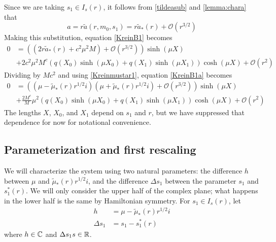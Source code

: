 \documentclass[thesis.tex]{subfiles}
\begin{document}
Since we are taking $s_1 \in I_s(r)$, it follows from \cref{tildeasub} and \cref{lemma:chara} that
\[
a = r \tilde{a}(r, m_0, s_1) = r\tilde{a}_*(r) + \mathcal{O}\left( r^{3/2} \right)
\]
Making this substitution, equation \cref{KreinB1} becomes
\begin{equation}\label{KreinB1a}
\begin{aligned}
0 &= \left( (2r\tilde{a}_*(r) + c^2 \mu^2 M) + \mathcal{O}( r^{3/2} )\right) \sinh(\mu X) \\
&+ 2 c^2 \mu^2 M^c ( q(X_0) \sinh(\mu X_0) + q(X_1) \sinh(\mu X_1) ) \cosh(\mu X) + \mathcal{O}( r^2 ) 
\end{aligned}
\end{equation}
Dividing by $M c^2$ and using \cref{Kreinmustar1}, equation \cref{KreinB1a} becomes
\begin{equation}\label{KreinB2}
\begin{aligned}
0 &= \left( (\mu - \tilde{\mu}_*(r) r^{1/2} i)( \mu + \tilde{\mu}_*(r) r^{1/2} i) +  \mathcal{O}( r^{3/2} )\right) \sinh(\mu X) \\
&+\frac{2 M^c}{M} \mu^2 ( q(X_0)\sinh(\mu X_0) + q(X_1) \sinh(\mu X_1) ) \cosh(\mu X) + \mathcal{O}( r^2 ) 
\end{aligned}
\end{equation}
The lengths $X$, $X_0$, and $X_1$ depend on $s_1$ and $r$, but we have suppressed that dependence for now for notational convenience. 

\subsection{Parameterization and first rescaling}

We will characterize the system using two natural parameters: the difference $h$ between $\mu$ and $\tilde{\mu}_*(r) r^{1/2} i$, and the difference $\Delta s_1$ between the parameter $s_1$ and $s_1^*(r)$. We will only consider the upper half of the complex plane; what happens in the lower half is the same by Hamiltonian symmetry. For $s_1 \in I_s(r)$, let
\begin{align*}
h &= \mu - \tilde{\mu}_*(r) r^{1/2} i \\
\Delta s_1 &= s_1 - s_1^*(r)
\end{align*}
where $h \in \mathbb{C}$ and $\Delta s_1 s \in \mathbb{R}$. 
\end{document}
